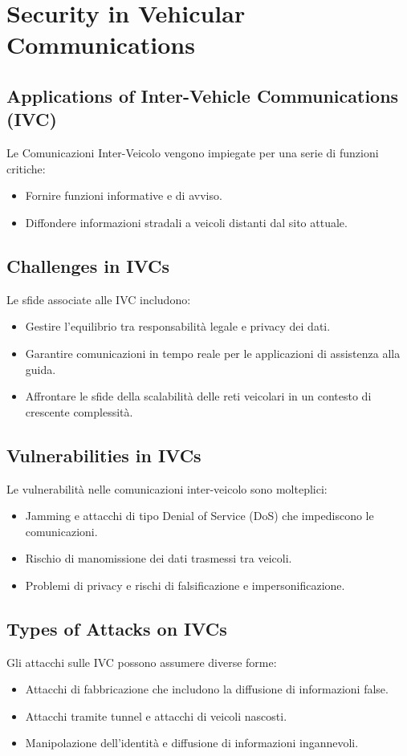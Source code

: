 \section{Security in Vehicular Communications}

\subsection{Applications of Inter-Vehicle Communications (IVC)} Le Comunicazioni
Inter-Veicolo vengono impiegate per una serie di funzioni critiche:
\begin{itemize} \item Fornire funzioni informative e di avviso. \item Diffondere
informazioni stradali a veicoli distanti dal sito attuale. \end{itemize}

\subsection{Challenges in IVCs} Le sfide associate alle IVC includono:
\begin{itemize} \item Gestire l'equilibrio tra responsabilità legale e privacy
dei dati. \item Garantire comunicazioni in tempo reale per le applicazioni di
assistenza alla guida. \item Affrontare le sfide della scalabilità delle reti
veicolari in un contesto di crescente complessità. \end{itemize}

\subsection{Vulnerabilities in IVCs} Le vulnerabilità nelle comunicazioni
inter-veicolo sono molteplici: \begin{itemize} \item Jamming e attacchi di tipo
Denial of Service (DoS) che impediscono le comunicazioni. \item Rischio di
manomissione dei dati trasmessi tra veicoli. \item Problemi di privacy e rischi
di falsificazione e impersonificazione. \end{itemize}

\subsection{Types of Attacks on IVCs} Gli attacchi sulle IVC possono assumere
diverse forme: \begin{itemize} \item Attacchi di fabbricazione che includono la
diffusione di informazioni false. \item Attacchi tramite tunnel e attacchi di
veicoli nascosti. \item Manipolazione dell'identità e diffusione di informazioni
ingannevoli. \end{itemize}

